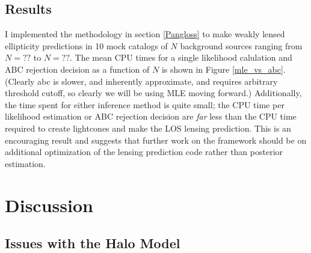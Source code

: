 \documentclass[%
 reprint,
 amsmath,amssymb,
 aps,nofootinbib
]{revtex4-1}
\begin{document}
\subsection{Results}

I implemented the methodology in section \ref{Pangloss} to make weakly lensed ellipticity predictions in 10 mock catalogs of $N$ background sources ranging from $N=??$ to $N=??$. The mean CPU times for a single likelihood calulation and ABC rejection decision as a function of $N$ is shown in Figure \ref{mle_vs_abc}. (Clearly abc is slower, and inherently approximate, and requires arbitrary threshold cutoff, so clearly we will be using MLE moving forward.) Additionally, the time spent for either inference method is quite small; the CPU time per likelihood estimation or ABC rejection decision are \textit{far} less than the CPU time required to create lightcones and make the LOS lensing prediction. This is an encouraging result and suggests that further work on the framework should be on additional optimization of the lensing prediction code rather than posterior estimation.



\section{Discussion}


\subsection{Issues with the Halo Model}
\end{document}
